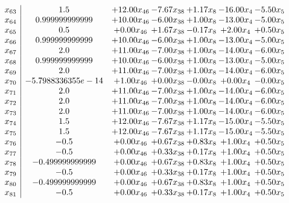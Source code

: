 \documentclass[8pt]{article}
\begin{document}
\[\begin{array}{c| c c@{\hskip 2pt} c@{\hskip 2pt} c@{\hskip 2pt} c@{\hskip 2pt} c@{\hskip 2pt} }
 x_{63}   &  1.5 & + 12.00 x_{46} & -7.67 x_{38} & +  1.17 x_{8} & -16.00 x_{4} & -5.50 x_{5}\\
 x_{64}   &  0.999999999999 & + 10.00 x_{46} & -6.00 x_{38} & +  1.00 x_{8} & -13.00 x_{4} & -5.00 x_{5}\\
 x_{65}   &  0.5 & +  0.00 x_{46} & +  1.67 x_{38} & -0.17 x_{8} & +  2.00 x_{4} & +  0.50 x_{5}\\
 x_{66}   &  0.999999999999 & + 10.00 x_{46} & -6.00 x_{38} & +  1.00 x_{8} & -13.00 x_{4} & -5.00 x_{5}\\
 x_{67}   &  2.0 & + 11.00 x_{46} & -7.00 x_{38} & +  1.00 x_{8} & -14.00 x_{4} & -6.00 x_{5}\\
 x_{68}   &  0.999999999999 & + 10.00 x_{46} & -6.00 x_{38} & +  1.00 x_{8} & -13.00 x_{4} & -5.00 x_{5}\\
 x_{69}   &  2.0 & + 11.00 x_{46} & -7.00 x_{38} & +  1.00 x_{8} & -14.00 x_{4} & -6.00 x_{5}\\
 x_{70}   &  -5.7988336355e-14 & +  1.00 x_{46} & +  0.00 x_{38} & -0.00 x_{8} & +  0.00 x_{4} & -0.00 x_{5}\\
 x_{71}   &  2.0 & + 11.00 x_{46} & -7.00 x_{38} & +  1.00 x_{8} & -14.00 x_{4} & -6.00 x_{5}\\
 x_{72}   &  2.0 & + 11.00 x_{46} & -7.00 x_{38} & +  1.00 x_{8} & -14.00 x_{4} & -6.00 x_{5}\\
 x_{73}   &  2.0 & + 11.00 x_{46} & -7.00 x_{38} & +  1.00 x_{8} & -14.00 x_{4} & -6.00 x_{5}\\
 x_{74}   &  1.5 & + 12.00 x_{46} & -7.67 x_{38} & +  1.17 x_{8} & -15.00 x_{4} & -5.50 x_{5}\\
 x_{75}   &  1.5 & + 12.00 x_{46} & -7.67 x_{38} & +  1.17 x_{8} & -15.00 x_{4} & -5.50 x_{5}\\
 x_{76}   &  -0.5 & +  0.00 x_{46} & +  0.67 x_{38} & +  0.83 x_{8} & +  1.00 x_{4} & +  0.50 x_{5}\\
 x_{77}   &  -0.5 & +  0.00 x_{46} & +  0.33 x_{38} & +  0.17 x_{8} & +  1.00 x_{4} & +  0.50 x_{5}\\
 x_{78}   &  -0.499999999999 & +  0.00 x_{46} & +  0.67 x_{38} & +  0.83 x_{8} & +  1.00 x_{4} & +  0.50 x_{5}\\
 x_{79}   &  -0.5 & +  0.00 x_{46} & +  0.33 x_{38} & +  0.17 x_{8} & +  1.00 x_{4} & +  0.50 x_{5}\\
 x_{80}   &  -0.499999999999 & +  0.00 x_{46} & +  0.67 x_{38} & +  0.83 x_{8} & +  1.00 x_{4} & +  0.50 x_{5}\\
 x_{81}   &  -0.5 & +  0.00 x_{46} & +  0.33 x_{38} & +  0.17 x_{8} & +  1.00 x_{4} & +  0.50 x_{5}\\

\end{array}\]
\end{document}
